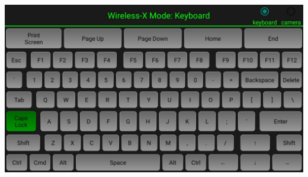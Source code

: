\documentclass[12pt, letterpaper]{article}
\begin{document}
\begin{enumerate}
\begin{center}
    \includegraphics[scale=0.25]{images/capsLock.jpeg}
\end{center}
\end{enumerate}
\end{document}
